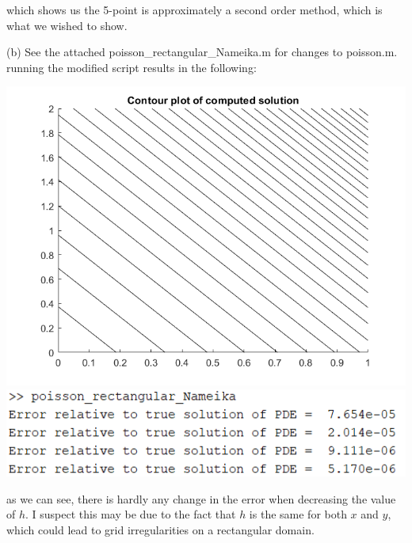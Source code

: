 \documentclass{article}
\begin{document}
which shows us the 5-point is approximately a second order method, which is what we wished to show.

(b) See the attached poisson\_rectangular\_Nameika.m for changes to poisson.m.
\newline
running the modified script results in the following:
\begin{center}
    \includegraphics[scale = 0.6]{rectangulardomaingraph.png}
    \includegraphics[scale = 0.8]{rectangulardomainerr.PNG}
\end{center}
as we can see, there is hardly any change in the error when decreasing the value of $h$. I suspect this may be due to the fact that $h$ is the same for both $x$ and $y$, which could lead to grid irregularities on a rectangular domain.
\end{document}
